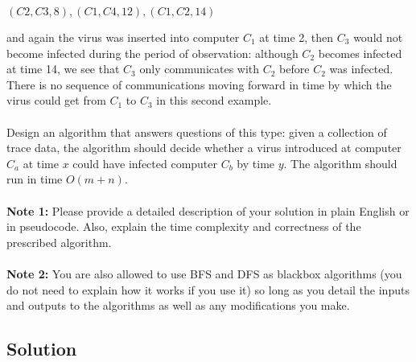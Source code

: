 \documentclass[11pt]{article}
\begin{document}
\begin{center}
$(C2, C3, 8), (C1,C4, 12), (C1, C2, 14)$
\end{center}
and again the virus was inserted into computer $C_1$ at time 2, then $C_3$ would not become infected during the period of observation: although $C_2$ becomes infected at time 14, we see that $C_3$ only communicates with $C_2$ before $C_2$ was infected. There is no sequence of communications moving forward in time by which the virus could get from $C_1$ to $C_3$ in this second example. \\ \\ \noindent
Design an algorithm that answers questions of this type: given a collection of trace data, the algorithm should decide whether a virus introduced at computer $C_a$ at time $x$ could have infected computer $C_b$ by time $y$. The algorithm should run in time $O(m+n)$.
\\ \\
\noindent
\textbf{Note 1:} Please provide a detailed description of your solution in plain English or in pseudocode. Also, explain the time complexity and correctness of the prescribed algorithm.\\ \\
\textbf{Note 2:} You are also allowed to use BFS and DFS as blackbox algorithms (you do not need to explain how it works if you use it) so long as you detail the inputs and outputs to the algorithms as well as any modifications you make.​

\subsection*{Solution}
\end{document}
